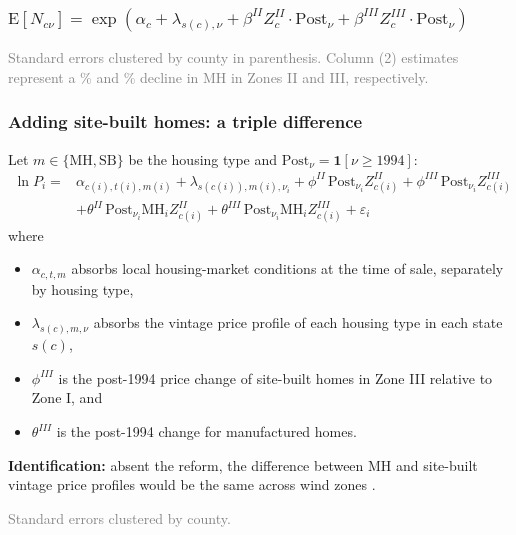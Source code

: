 \documentclass[11pt,xcolor={dvipsnames},hyperref={pdftex,pdfpagemode=UseNone,hidelinks,pdfdisplaydoctitle=true},usepdftitle=false,aspectratio=169]{beamer}
\newcommand{\gc}[1]{{\footnotesize\textcolor{gray}{#1}}}
\begin{document}
\begin{frame}\label{frame:quantity-static}
    \frametitle{$\mathrm{E}[N_{c\nu}] = \exp\!\left(\alpha_c + \lambda_{s(c),\nu} + \beta^{II} Z^{II}_c \cdot \mathrm{Post}_\nu + \beta^{III} Z^{III}_c \cdot \mathrm{Post}_\nu\right)$}

    \vspace{-0.5em}

    \begin{table}
    \centering
    \resizebox*{!}{0.80\textheight}{}
    \end{table}

    \par \gc{Standard errors clustered by county in parenthesis. Column (2) estimates represent a \vClQtyZoneTwoPct\% and \vClQtyZoneThreePct\% decline in MH in Zones II and III, respectively.} \hfill \hyperlink{frame:census-quantity}{}
\end{frame}

\begin{frame}
    \frametitle{Adding site-built homes: a triple difference}
    Let $m\in\{\text{MH},\text{SB}\}$ be the housing type and $\mathrm{Post}_\nu=\mathbf{1}[\nu\geq 1994]$:
    \[
    \begin{split}
    \ln P_i = {} & \alpha_{c(i),t(i),m(i)} + \lambda_{s(c(i)),m(i),\nu_i}
      + \phi^{II}\,\mathrm{Post}_{\nu_i} Z^{II}_{c(i)} + \phi^{III}\,\mathrm{Post}_{\nu_i} Z^{III}_{c(i)} \\
    & + \theta^{II}\,\mathrm{Post}_{\nu_i}\text{MH}_i Z^{II}_{c(i)}
      + \theta^{III}\,\mathrm{Post}_{\nu_i}\text{MH}_i Z^{III}_{c(i)} + \varepsilon_i
    \end{split}
    \]
    where
    \begin{itemize}
        \item $\alpha_{c,t,m}$ absorbs local housing-market conditions at the time of sale, separately by housing type,
        \item $\lambda_{s(c),m,\nu}$ absorbs the vintage price profile of each housing type in each state $s(c)$,
        \item $\phi^{III}$ is the post-1994 price change of site-built homes in Zone III relative to Zone I, and
        \item $\theta^{III}$ is the  post-1994 change for manufactured homes.
    \end{itemize}
    \vspace{0.5em}
    \textbf{Identification:} absent the reform, the difference between MH and site-built vintage price profiles would be the same across wind zones .

    \vfill
    \gc{Standard errors clustered by county.}
\end{frame}
\end{document}
